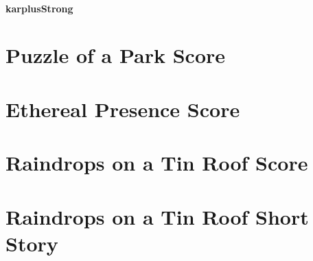\subsubsection{karplusStrong}
\vspace{5mm}



\chapter{Puzzle of a Park Score}



\chapter{Ethereal Presence Score}



\chapter{Raindrops on a Tin Roof Score}

 

\chapter{Raindrops on a Tin Roof Short Story}








\backmatter


